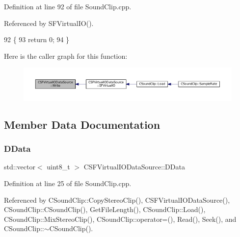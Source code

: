 Definition at line 92 of file Sound\+Clip.\+cpp.



Referenced by S\+F\+Virtual\+I\+O().


\begin{DoxyCode}
92                                                                                                            
      \{
93     \textcolor{keywordflow}{return} 0;
94 \}
\end{DoxyCode}
Here is the caller graph for this function\+:\nopagebreak
\begin{figure}[H]
\begin{center}
\leavevmode
\includegraphics[width=350pt]{classCSFVirtualIODataSource_ac1d38c4c9d8ba3e0a2affd7dd72283ee_icgraph}
\end{center}
\end{figure}


\subsection{Member Data Documentation}
\hypertarget{classCSFVirtualIODataSource_ac03be5c46b6647150e12edc04fa52ede}{}\label{classCSFVirtualIODataSource_ac03be5c46b6647150e12edc04fa52ede} 
\subsubsection{\texorpdfstring{D\+Data}{DData}}
{\footnotesize\ttfamily std\+::vector$<$ uint8\+\_\+t $>$ C\+S\+F\+Virtual\+I\+O\+Data\+Source\+::\+D\+Data\hspace{0.3cm}{\ttfamily [protected]}}



Definition at line 25 of file Sound\+Clip.\+cpp.



Referenced by C\+Sound\+Clip\+::\+Copy\+Stereo\+Clip(), C\+S\+F\+Virtual\+I\+O\+Data\+Source(), C\+Sound\+Clip\+::\+C\+Sound\+Clip(), Get\+File\+Length(), C\+Sound\+Clip\+::\+Load(), C\+Sound\+Clip\+::\+Mix\+Stereo\+Clip(), C\+Sound\+Clip\+::operator=(), Read(), Seek(), and C\+Sound\+Clip\+::$\sim$\+C\+Sound\+Clip().

